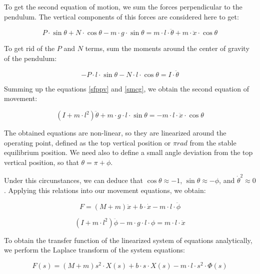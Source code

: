\documentclass{article}
\begin{document}
To get the second equation of motion, we sum the forces perpendicular to the pendulum. The vertical components of this forces are considered here to get:

\begin{equation} \label{sfppv}
P\cdot \sin{\theta}+N\cdot \cos{\theta}-m\cdot g\cdot \sin{\theta}=m\cdot l\cdot \ddot{\theta}+m\cdot \ddot{x}\cdot \cos{\theta}
\end{equation}

To get rid of the $P$ and $N$ terms, sum the moments around the center of gravity of the pendulum:

\begin{equation} \label{smcg}
-P\cdot l\cdot \sin{\theta}-N\cdot l\cdot \cos{\theta}=I\cdot \ddot{\theta}
\end{equation}

Summing up the equations \ref{sfppv} and \ref{smcg}, we obtain the second equation of movement:

\begin{equation} \label{sem}
(I+m\cdot l^2)\ddot{\theta}+m\cdot g\cdot l\cdot \sin{\theta}=-m\cdot l\cdot \ddot{x}\cdot \cos{\theta}
\end{equation}

The obtained equations are non-linear, so they are linearized around the operating point, defined as the top vertical position or $\pi rad$ from the stable equilibrium position. We need also to define a small angle deviation from the top vertical position, so that $\theta=\pi+\phi$.

Under this circunstances, we can deduce that $\cos{\theta}\approx -1$, $\sin{\theta}\approx -\phi$, and $\dot{\theta}^2\approx 0$. Applying this relations into our movement equations, we obtain:

\begin{equation} \label{feml}
F=(M+m)\ddot{x}+b\cdot \dot{x}-m\cdot l\cdot \ddot{\phi}
\end{equation}

\begin{equation} \label{seml}
(I+m\cdot l^2)\ddot{\phi}-m\cdot g\cdot l\cdot \phi=m\cdot l\cdot \ddot{x}
\end{equation}

To obtain the transfer function of the linearized system of equations analytically, we perform the Laplace transform of the system equations:

\begin{equation} \label{fems}
F(s)=(M+m)s^2\cdot X(s)+b\cdot s\cdot X(s)-m\cdot l\cdot s^2\cdot \Phi(s)
\end{equation}
\end{document}
